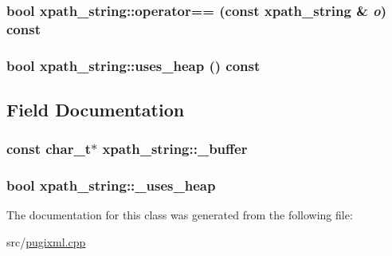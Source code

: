 \label{classxpath__string_afca32de44459a6805b90c517d5d5ab75}
\hypertarget{classxpath__string_a42fc30d8b2434d89e724436f99458abd}{
\subsubsection[{operator==}]{\setlength{\rightskip}{0pt plus 5cm}bool xpath\_\-string::operator== (const {\bf xpath\_\-string} \& {\em o}) const}}
\label{classxpath__string_a42fc30d8b2434d89e724436f99458abd}
\hypertarget{classxpath__string_ac8cab48475690223df758e5ab2368533}{
\subsubsection[{uses\_\-heap}]{\setlength{\rightskip}{0pt plus 5cm}bool xpath\_\-string::uses\_\-heap () const}}
\label{classxpath__string_ac8cab48475690223df758e5ab2368533}


\subsection{Field Documentation}
\hypertarget{classxpath__string_ad52a80412797ca64bbd1bff527e9d666}{
\subsubsection[{\_\-buffer}]{\setlength{\rightskip}{0pt plus 5cm}const char\_\-t$\ast$ {\bf xpath\_\-string::\_\-buffer}}}
\label{classxpath__string_ad52a80412797ca64bbd1bff527e9d666}
\hypertarget{classxpath__string_a67a86f6d1a9cf20b922fc9fb1268d4c1}{
\subsubsection[{\_\-uses\_\-heap}]{\setlength{\rightskip}{0pt plus 5cm}bool {\bf xpath\_\-string::\_\-uses\_\-heap}}}
\label{classxpath__string_a67a86f6d1a9cf20b922fc9fb1268d4c1}


The documentation for this class was generated from the following file:\begin{DoxyCompactItemize}
\item 
src/\hyperlink{pugixml_8cpp}{pugixml.cpp}\end{DoxyCompactItemize}
